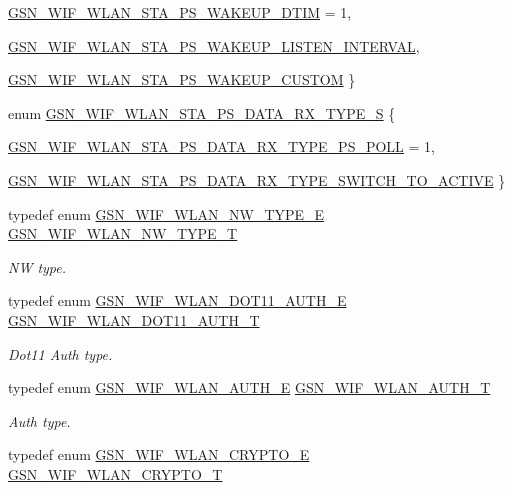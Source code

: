 \begin{DoxyCompactItemize}
\hyperlink{a00677_ga37d0f17a3334d0645a337ca71c7c9bcbaa23860ccfc8a196b0548d18ca4ad6976}{GSN\_\-WIF\_\-WLAN\_\-STA\_\-PS\_\-WAKEUP\_\-DTIM} = 1, 
\par
\hyperlink{a00677_ga37d0f17a3334d0645a337ca71c7c9bcbaaa97fd2407d90cdf0a9f9ea24409c915}{GSN\_\-WIF\_\-WLAN\_\-STA\_\-PS\_\-WAKEUP\_\-LISTEN\_\-INTERVAL}, 
\par
\hyperlink{a00677_ga37d0f17a3334d0645a337ca71c7c9bcbaf9d18e3274cb9ca7a37a8d9f3e738bae}{GSN\_\-WIF\_\-WLAN\_\-STA\_\-PS\_\-WAKEUP\_\-CUSTOM}
 \}
\item 
enum \hyperlink{a00677_ga28466fa12055a0a4209a8280d845b52e}{GSN\_\-WIF\_\-WLAN\_\-STA\_\-PS\_\-DATA\_\-RX\_\-TYPE\_\-S} \{ \par
\hyperlink{a00677_ga28466fa12055a0a4209a8280d845b52ea006b93ce062cf46d6fa992aa49f68981}{GSN\_\-WIF\_\-WLAN\_\-STA\_\-PS\_\-DATA\_\-RX\_\-TYPE\_\-PS\_\-POLL} = 1, 
\par
\hyperlink{a00677_ga28466fa12055a0a4209a8280d845b52ea8c8d2cd41e7f515c06ea7867e9314250}{GSN\_\-WIF\_\-WLAN\_\-STA\_\-PS\_\-DATA\_\-RX\_\-TYPE\_\-SWITCH\_\-TO\_\-ACTIVE}
 \}
\item 
typedef enum \hyperlink{a00677_ga4d89b2a0c901a8c766f195897f16623f}{GSN\_\-WIF\_\-WLAN\_\-NW\_\-TYPE\_\-E} \hyperlink{a00677_gabc852e0cb262314c5f307a3e9802921e}{GSN\_\-WIF\_\-WLAN\_\-NW\_\-TYPE\_\-T}
\begin{DoxyCompactList}\small\item\em NW type. \end{DoxyCompactList}\item 
typedef enum \hyperlink{a00677_ga5415d31a2d60b731af07dc04240e540c}{GSN\_\-WIF\_\-WLAN\_\-DOT11\_\-AUTH\_\-E} \hyperlink{a00677_gaa550b3e9decb3a2585cb801dde9e5609}{GSN\_\-WIF\_\-WLAN\_\-DOT11\_\-AUTH\_\-T}
\begin{DoxyCompactList}\small\item\em Dot11 Auth type. \end{DoxyCompactList}\item 
typedef enum \hyperlink{a00677_ga2b3917a91d576d0d037c406e6397cab9}{GSN\_\-WIF\_\-WLAN\_\-AUTH\_\-E} \hyperlink{a00677_ga07b4b8b059f529183cc5da3aadfa2966}{GSN\_\-WIF\_\-WLAN\_\-AUTH\_\-T}
\begin{DoxyCompactList}\small\item\em Auth type. \end{DoxyCompactList}\item 
typedef enum \hyperlink{a00677_ga49c8ff4188538f53965f3e0916f59746}{GSN\_\-WIF\_\-WLAN\_\-CRYPTO\_\-E} \hyperlink{a00677_gac2cbed9ce43ac5da06c3a3396bbaaf31}{GSN\_\-WIF\_\-WLAN\_\-CRYPTO\_\-T}

\end{DoxyCompactItemize}
